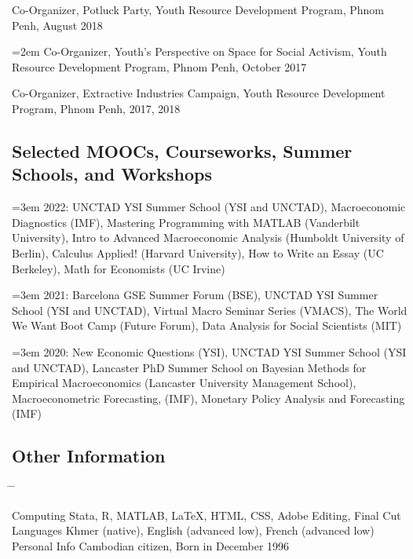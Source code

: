 \documentclass[10pt,a4paper]{article}
\newcommand{\tabbedblock}[1]{

	\begin{tabbing}
		\hspace{3cm} \= \hspace{4cm} \= \kill
		#1
	\end{tabbing}
}
\begin{document}
	Co-Organizer, Potluck Party, Youth Resource Development Program, Phnom Penh, August 2018

\hangindent=2em
	Co-Organizer, Youth's Perspective on Space for Social Activism, Youth Resource Development Program, Phnom Penh, October 2017
		
	Co-Organizer, Extractive Industries Campaign, Youth Resource Development Program, Phnom Penh, 2017, 2018		

\subsection*{Selected MOOCs, Courseworks, Summer Schools, and Workshops}

\hangindent=3em
	2022: UNCTAD YSI Summer School (YSI and UNCTAD), Macroeconomic Diagnostics (IMF), Mastering Programming with MATLAB (Vanderbilt University), Intro to Advanced Macroeconomic Analysis (Humboldt University of Berlin), Calculus Applied! (Harvard University), How to Write an Essay (UC Berkeley), Math for Economists (UC Irvine)

\hangindent=3em
	2021: Barcelona GSE Summer Forum (BSE), UNCTAD YSI Summer School (YSI and UNCTAD), Virtual Macro Seminar Series (VMACS), The World We Want Boot Camp (Future Forum), Data Analysis for Social Scientists (MIT)

\hangindent=3em
	2020: New Economic Questions (YSI), UNCTAD YSI Summer School (YSI and UNCTAD), Lancaster PhD Summer School on Bayesian Methods for Empirical Macroeconomics (Lancaster University Management School), Macroeconometric Forecasting, (IMF), Monetary Policy Analysis and Forecasting (IMF)

\subsection*{Other Information}

\tabbedblock{
	Computing \> Stata, R, MATLAB, \LaTeX, HTML, CSS, Adobe Editing, Final Cut\\

	Languages \> Khmer (native), English (advanced low), French (advanced low)\\
	
	Personal Info \> Cambodian citizen, Born in December 1996
}
\end{document}
